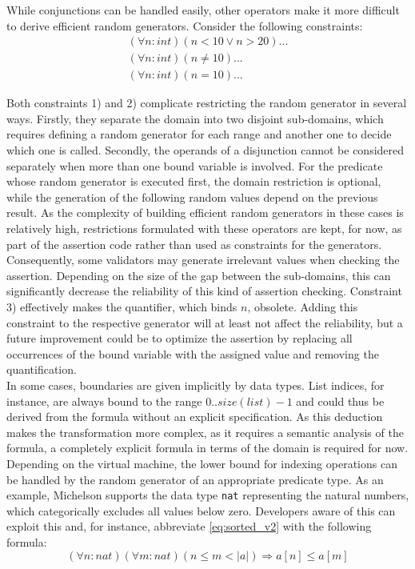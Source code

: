 While conjunctions can be handled easily, other operators make it more difficult to derive efficient random generators. Consider the following constraints:
\begin{align}
(\forall n : int) (n < 10 \lor n > 20) ... \\
(\forall n : int) (n \ne 10) ... \\
(\forall n : int) (n = 10) ... 
\end{align}

Both constraints 1) and 2) complicate restricting the random generator in several ways. Firstly, they separate the domain into two disjoint sub-domains, which requires defining a random generator for each range and another one to decide which one is called. Secondly, the operands of a disjunction cannot be considered separately when more than one bound variable is involved. For the predicate whose random generator is executed first, the domain restriction is optional, while the generation of the following random values depend on the previous result. As the complexity of building efficient random generators in these cases is relatively high, restrictions formulated with these operators are kept, for now, as part of the assertion code rather than used as constraints for the generators. Consequently, some validators may generate irrelevant values when checking the assertion. Depending on the size of the gap between the sub-domains, this can significantly decrease the reliability of this kind of assertion checking. Constraint 3) effectively makes the quantifier, which binds $n$, obsolete. Adding this constraint to the respective generator will at least not affect the reliability, but a future improvement could be to optimize the assertion by replacing all occurrences of the bound variable with the assigned value and removing the quantification.\\

In some cases, boundaries are given implicitly by data types. List indices, for instance, are always bound to the range $0.. size(list) - 1$ and could thus be derived from the formula without an explicit specification. As this deduction makes the transformation more complex, as it requires a semantic analysis of the formula, a completely explicit formula in terms of the domain is required for now. Depending on the virtual machine, the lower bound for indexing operations can be handled by the random generator of an appropriate predicate type. As an example, Michelson supports the data type \texttt{nat} representing the natural numbers, which categorically excludes all values below zero. Developers aware of this can exploit this and, for instance, abbreviate \eqref{eq:sorted_v2} with the following formula:
\begin{equation}\label{eq:sorted_v2_abbr}
	(\forall n : nat)(\forall m : nat) (n \le m < |a|) \Rightarrow a[n] \leq a[m]
\end{equation}

